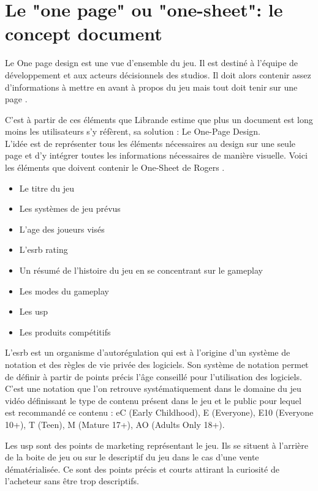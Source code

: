 \section{Le "one page" ou "one-sheet": le concept document}
Le One page design est une vue d'ensemble du jeu. Il est destiné à l'équipe de développement et aux acteurs décisionnels des studios. Il doit alors contenir assez d'informations à mettre en avant à propos du jeu mais tout doit tenir sur une page \cite{LevelUpRogers2014}.

C'est à partir de ces éléments que Librande \cite{onepage_librande} estime que plus un document est long moins les utilisateurs s'y réfèrent, sa solution : Le One-Page Design.\\
L'idée est de représenter tous les éléments nécessaires au design sur une seule page et d'y intégrer toutes les informations nécessaires de manière visuelle. 
Voici les éléments que doivent contenir le One-Sheet de Rogers \cite{LevelUpRogers2014}.
\begin{itemize}
    \item Le titre du jeu
    \item Les systèmes de jeu prévus
    \item L'age des joueurs visés
    \item L'\gls{esrb} rating
    \item Un résumé de l'histoire du jeu en se concentrant sur le gameplay
    \item Les modes du gameplay
    \item Les \gls{usp}
    \item Les produits compétitifs
\end{itemize}

L'\gls{esrb} est un organisme d'autorégulation qui est à l'origine d'un système de notation et des règles de vie privée des logiciels. Son système de notation permet de définir à partir de points précis l'âge conseillé pour l'utilisation des logiciels. C'est une notation que l'on retrouve systématiquement dans le domaine du jeu vidéo définissant le type de contenu présent dans le jeu et le public pour lequel est recommandé ce contenu : eC (Early Childhood), E (Everyone), E10 (Everyone 10+), T (Teen), M (Mature 17+), AO (Adults Only 18+).

Les \gls{usp} sont des points de marketing représentant le jeu. Ils se situent à l'arrière de la boite de jeu ou sur le descriptif du jeu dans le cas d'une vente dématérialisée. Ce sont des points précis et courts attirant la curiosité de l'acheteur sans être trop descriptifs. 

